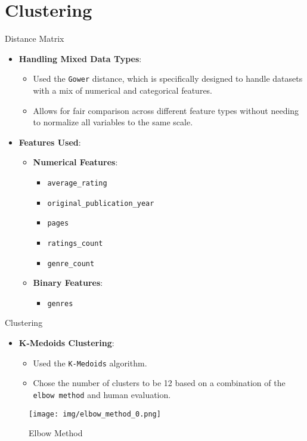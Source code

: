 \documentclass{beamer}
\begin{document}
\section{Clustering}
\begin{frame}{Distance Matrix}
    \begin{itemize}
        \item \textbf{Handling Mixed Data Types}: 
            \begin{itemize}
                \item Used the \texttt{Gower} distance, which is specifically designed to handle datasets with a mix of numerical and categorical features.
                \item Allows for fair comparison across different feature types without needing to normalize all variables to the same scale.
            \end{itemize}
        \item \textbf{Features Used}:
            \begin{itemize}
                \item \textbf{Numerical Features}:
                    \begin{itemize}
                        \item \texttt{average\_rating}
                        \item \texttt{original\_publication\_year}
                        \item \texttt{pages}
                        \item \texttt{ratings\_count}
                        \item \texttt{genre\_count}
                    \end{itemize}
                \item \textbf{Binary Features}:
                    \begin{itemize}
                        \item \texttt{genres}
                    \end{itemize}
            \end{itemize}
    \end{itemize}
\end{frame}

\begin{frame}{Clustering}
    \begin{itemize}
        \item \textbf{K-Medoids Clustering}:
            \begin{itemize}
                \item Used the \texttt{K-Medoids} algorithm.
                \item Chose the number of clusters to be 12 based on a combination of the \texttt{elbow method} and human evaluation.
            \end{itemize}
    \end{itemize}
    \begin{figure}
        \centering
        \texttt{[image: img/elbow\_method\_0.png]}
        \caption{Elbow Method}
    \end{figure}
\end{frame}
\end{document}
